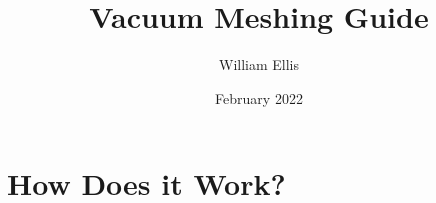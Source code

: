 \documentclass[12pt, letterpaper]{article}
\begin{document}
\begin{titlepage}
	\begin{center}
        \vspace*{1cm}	
		\title{Vacuum Meshing Guide}
		\author{William Ellis}
		\date{February 2022}   
		\maketitle
	\end{center}
\end{titlepage}

\maketitle

\section{How Does it Work?}
\end{document}
